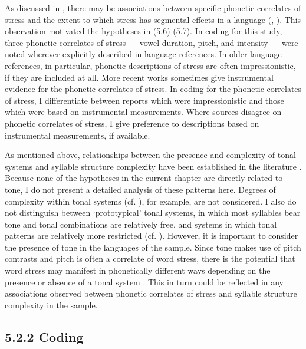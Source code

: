   As discussed in , there may be associations between specific phonetic correlates of stress and the extent to which stress has segmental effects in a language (\citealt{BybeeEtAl1998}, \citealt{Schiering2007}). This observation motivated the hypotheses in (5.6)-(5.7). In coding for this study, three phonetic correlates of stress — vowel duration, pitch, and intensity — were noted wherever explicitly described in language references. In older language references, in particular, phonetic descriptions of stress are often impressionistic, if they are included at all. More recent works sometimes give instrumental evidence for the phonetic correlates of stress. In coding for the phonetic correlates of stress, I differentiate between reports which were impressionistic and those which were based on instrumental measurements. Where sources disagree on phonetic correlates of stress, I give preference to descriptions based on instrumental measurements, if available.



  As mentioned above, relationships between the presence and complexity of tonal systems and syllable structure complexity have been established in the literature \citep{Maddieson2013d}. Because none of the hypotheses in the current chapter are directly related to tone, I do not present a detailed analysis of these patterns here. Degrees of complexity within tonal systems (cf. \citealt{Maddieson2013d}), for example, are not considered. I also do not distinguish between ‘prototypical’ tonal systems, in which most syllables bear tone and tonal combinations are relatively free, and systems in which tonal patterns are relatively more restricted (cf. \citealt{Hyman2009}). However, it is important to consider the presence of tone in the languages of the sample. Since tone makes use of pitch contrasts and pitch is often a correlate of word stress, there is the potential that word stress may manifest in phonetically different ways depending on the presence or absence of a tonal system \citep{Gordon2011}. This in turn could be reflected in any associations observed between phonetic correlates of stress and syllable structure complexity in the sample. 


\subsection{5.2.2 Coding}

